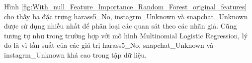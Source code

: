 \begin{enumerate}[label=(\alph*)]
    Hình \ref{fig:With_null_Feature_Importance_Random_Forest_original_features} cho thấy ba đặc trưng harass5\_No, instagrm\_Unknown và snapchat\_Unknown được sử dụng nhiều nhất để phân loại các quan sát theo các nhãn giả.
    Cũng tương tự như trong trường hợp với mô hình Multinomial Logistic Regression, lý do là vì tần suất của các giá trị harass5\_No, snapchat\_Unknown và instagrm\_Unknown khá cao trong tập dữ liệu.
\end{enumerate}